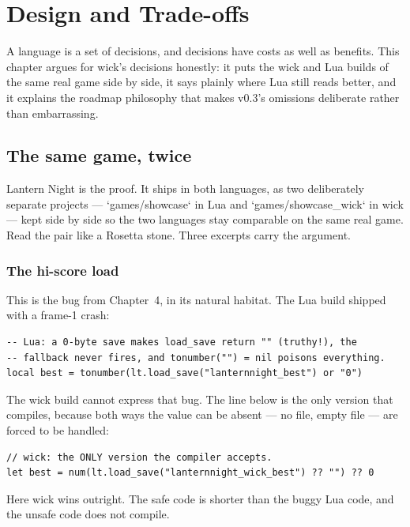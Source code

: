 \chapter{Design and Trade-offs}

A language is a set of decisions, and decisions have costs as well as
benefits. This chapter argues for wick's decisions honestly: it puts the wick
and Lua builds of the same real game side by side, it says plainly where Lua
still reads better, and it explains the roadmap philosophy that makes v0.3's
omissions deliberate rather than embarrassing.

\section{The same game, twice}

Lantern Night is the proof. It ships in both languages, as two deliberately
separate projects --- `games/showcase` in Lua and `games/showcase_wick` in
wick --- kept side by side so the two languages stay comparable on the same
real game. Read the pair like a Rosetta stone. Three excerpts carry the
argument.

\subsection{The hi-score load}

This is the bug from Chapter~4, in its natural habitat. The Lua build shipped
with a frame-1 crash:

\begin{lstlisting}[language=luatwin]
-- Lua: a 0-byte save makes load_save return "" (truthy!), the
-- fallback never fires, and tonumber("") = nil poisons everything.
local best = tonumber(lt.load_save("lanternnight_best") or "0")
\end{lstlisting}

\noindent
The wick build cannot express that bug. The line below is the only version
that compiles, because both ways the value can be absent --- no file, empty
file --- are forced to be handled:

\begin{lstlisting}[language=wick]
// wick: the ONLY version the compiler accepts.
let best = num(lt.load_save("lanternnight_wick_best") ?? "") ?? 0
\end{lstlisting}

\noindent
Here wick wins outright. The safe code is shorter than the buggy Lua code, and
the unsafe code does not compile.

